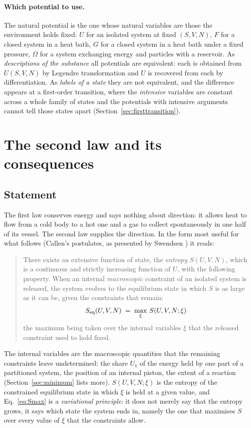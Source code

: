 \documentclass[10pt,a4paper]{article}
\theoremstyle{remark}
\begin{document}
\paragraph{Which potential to use.} The natural potential is the one whose
natural variables are those the environment holds fixed: $U$ for an isolated
system at fixed $(S,V,N)$, $F$ for a closed system in a heat bath, $G$ for a
closed system in a heat bath under a fixed pressure, $\Omega$ for a system
exchanging energy and particles with a reservoir. As \emph{descriptions of the
substance} all potentials are equivalent: each is obtained from
$U(S,V,N)$ by Legendre transformation and $U$ is recovered from each by
differentiation. As \emph{labels of a state} they are not equivalent, and the
difference appears at a first-order transition, where the \emph{intensive} variables
are constant across a whole family of states and the potentials with intensive
arguments cannot tell those states apart (Section~\ref{sec:firsttransition}).

\section{The second law and its consequences}
\label{sec:second}

\subsection{Statement}
\label{sec:secondlaw}

The first law conserves energy and says nothing about direction: it allows heat
to flow from a cold body to a hot one and a gas to collect spontaneously in
one half of its vessel. The second law supplies the direction. In the form
most useful for what follows (Callen's postulates, as presented by Swendsen
\cite{Swendsen}) it reads:
\begin{quote}
There exists an extensive function of state, the \emph{entropy} $S(U,V,N)$,
which is a continuous and strictly increasing function of $U$, with the
following property.
When an internal \emph{macroscopic} constraint of an isolated system is
released, the system evolves to the equilibrium state in which $S$ is as large
as it can be, given the constraints that remain:
\begin{equation}\label{eq:Smax}
  S_{\rm eq}(U,V,N)\;=\;\max_{\xi}\,S(U,V,N;\xi)
\end{equation}
the maximum being taken over the internal variables $\xi$ that the released
constraint used to hold fixed.
\end{quote}
The internal variables are the macroscopic quantities that the remaining
constraints leave undetermined: the share $U_1$ of the energy held by one part
of a partitioned system, the position of an internal piston, the extent of a
reaction (Section~\ref{sec:minimum} lists more). $S(U,V,N;\xi)$ is the entropy
of the constrained equilibrium state in which $\xi$ is held at a given value,
and Eq.~\eqref{eq:Smax} is a \emph{variational principle}: it does not merely
say that the entropy grows, it says which state the system ends in, namely the
one that maximises $S$ over every value of $\xi$ that the constraints allow.
\end{document}
